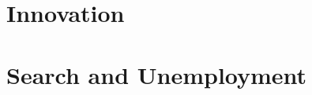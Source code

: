 \section{Innovation}
    \subsection{\cite{Prato2022}}

    \subsection{\cite{BaiJinLu2023}}

    \subsection{\cite{AdaoBerajaPandalaiNayar2020}}

    \subsection{\cite{LiuMa2023}}

\section{Search and Unemployment}
    \subsection{\cite{Shimer2005}}

\newpage
